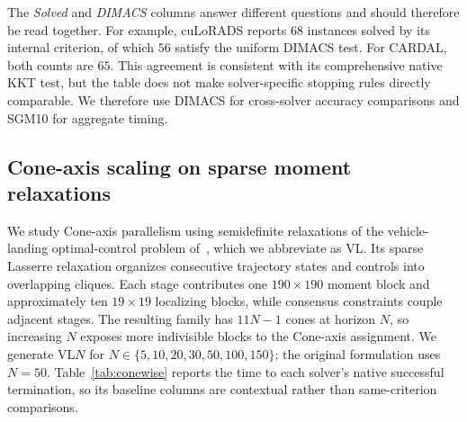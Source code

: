 \documentclass[11pt]{article}
\theoremstyle{definition}
\theoremstyle{remark}
\newcommand{\name}{\textsc{CARDAL}\xspace}
\begin{document}
The \emph{Solved} and \emph{DIMACS} columns answer different questions and
should therefore be read together.  For example, cuLoRADS reports $68$
instances solved by its internal criterion, of which $56$ satisfy the
uniform DIMACS test.  For \name{}, both counts are $65$.  This agreement is
consistent with its comprehensive native KKT test, but the table does not make
solver-specific stopping rules directly comparable.  We therefore use
DIMACS for cross-solver accuracy comparisons and SGM10 for aggregate timing.

\subsection{Cone-axis scaling on sparse moment relaxations}
\label{subsec:conewise}

We study Cone-axis parallelism using semidefinite relaxations of the
vehicle-landing optimal-control problem of~\cite{kang2024fast}, which we
abbreviate as VL.
Its sparse Lasserre relaxation organizes consecutive trajectory states and
controls into overlapping cliques.  Each stage contributes one
$190\times190$ moment block and approximately ten $19\times19$ localizing
blocks, while consensus constraints couple adjacent stages.  The resulting
family has $11N-1$ cones at horizon $N$, so increasing $N$ exposes more
indivisible blocks to the Cone-axis assignment.  We generate VL$N$ for
$N\in\{5,10,20,30,50,100,150\}$; the original formulation uses $N=50$.
Table~\ref{tab:conewise} reports the time to each solver's native successful
termination, so its baseline columns are contextual rather than
same-criterion comparisons.
\end{document}
